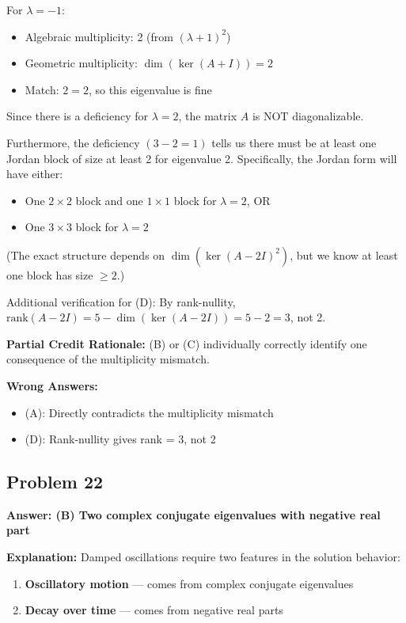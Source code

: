 \documentclass[12pt]{amsart}
\newcommand{\correct}[1]{{\color{correctgreen}\textbf{#1}}}
\begin{document}
For $\lambda = -1$:
\begin{itemize}
\item Algebraic multiplicity: 2 (from $(\lambda + 1)^2$)
\item Geometric multiplicity: $\dim(\ker(A + I)) = 2$
\item Match: $2 = 2$, so this eigenvalue is fine
\end{itemize}

Since there is a deficiency for $\lambda = 2$, the matrix $A$ is NOT diagonalizable.

Furthermore, the deficiency $(3-2=1)$ tells us there must be at least one Jordan block of size at least 2 for eigenvalue 2. Specifically, the Jordan form will have either:
\begin{itemize}
\item One $2 \times 2$ block and one $1 \times 1$ block for $\lambda = 2$, OR
\item One $3 \times 3$ block for $\lambda = 2$
\end{itemize}

(The exact structure depends on $\dim(\ker(A-2I)^2)$, but we know at least one block has size $\geq 2$.)

Additional verification for (D): By rank-nullity, $\text{rank}(A - 2I) = 5 - \dim(\ker(A-2I)) = 5 - 2 = 3$, not 2.

\textbf{Partial Credit Rationale:} (B) or (C) individually correctly identify one consequence of the multiplicity mismatch.

\textbf{Wrong Answers:}
\begin{itemize}
\item (A): Directly contradicts the multiplicity mismatch
\item (D): Rank-nullity gives rank = 3, not 2
\end{itemize}

\subsection*{Problem 22}
\correct{Answer: (B) Two complex conjugate eigenvalues with negative real part}

\textbf{Explanation:} Damped oscillations require two features in the solution behavior:
\begin{enumerate}
\item \textbf{Oscillatory motion} — comes from complex conjugate eigenvalues
\item \textbf{Decay over time} — comes from negative real parts
\end{enumerate}
\end{document}
